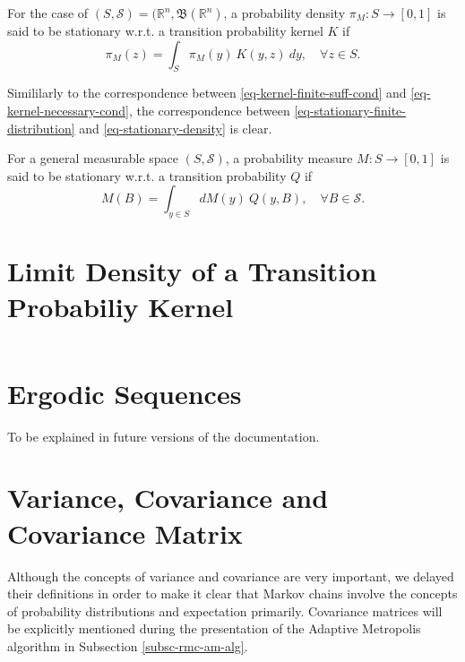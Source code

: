 For the case of $(S,\mathcal{S})=(\mathbb{R}^n,\mathfrak{B}(\mathbb{R}^n)$,
a probability density $\pi_M:S\rightarrow [0,1]$ is said to be stationary w.r.t. a transition probability kernel $K$ if
\begin{equation}\label{eq-stationary-density}
\pi_M(z) = \int_{S}\pi_M(y)~K(y,z)~dy,\quad\forall z\in S.
\end{equation}

Simililarly to the correspondence between \eqref{eq-kernel-finite-suff-cond} and \eqref{eq-kernel-necessary-cond},
the correspondence between \eqref{eq-stationary-finite-distribution} and \eqref{eq-stationary-density} is clear.

For a general measurable space $(S,\mathcal{S})$,
a probability measure $M:S\rightarrow [0,1]$ is said to be stationary w.r.t. a transition probability $Q$ if
\begin{equation*}
M(B) = \int_{y\in S}dM(y)~Q(y,B),\quad\forall B\in\mathcal{S}.
\end{equation*}

\section{Limit Density of a Transition Probabiliy Kernel}
$~$\\

\section{Ergodic Sequences}

To be explained in future versions of the documentation.

\section{Variance, Covariance and Covariance Matrix}

Although the concepts of variance and covariance are very important, we delayed their definitions in order to make it clear that Markov chains involve the concepts of probability distributions and expectation primarily.
Covariance matrices will be explicitly mentioned during the presentation of the Adaptive Metropolis algorithm in Subsection \ref{subsc-rmc-am-alg}.
